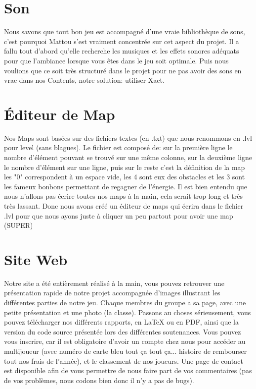 \documentclass [11pt]{report}
\begin{document}
	\section{Son}
	Nous savons que tout bon jeu est accompagné d'une vraie bibliothèque de sons, c'est pourquoi Mattou s'est vraiment concentrée sur cet aspect du projet. Il a fallu tout d'abord qu'elle recherche les musiques et les effets sonores adéquats pour que l'ambiance lorsque vous êtes dans le jeu soit optimale. Puis nous voulions que ce soit très structuré dans le projet pour ne pas avoir des sons en vrac dans nos Contents, notre solution: utiliser Xact. 
	
	\newpage
	\section{\'Editeur de Map}
	Nos Maps sont basées sur des fichiers textes (en .txt) que nous renommons en .lvl pour level (sans blagues). Le fichier est composé de: sur la première ligne le nombre d'élément pouvant se trouvé sur une même colonne, sur la deuxième ligne le nombre d'élément sur une ligne, puis sur le reste c'est la définition de la map %
	les "0" correspondent à un espace vide, les 4 sont eux des obstacles et les 3 sont les fameux bonbons permettant de regagner de l'énergie.
	\indent Il est bien entendu que nous n'allons pas écrire toutes nos maps à la main, cela serait trop long et très très lassant. Donc nous avons créé un éditeur de maps qui écrira dans le fichier .lvl pour que nous ayons juste à cliquer un peu partout pour avoir une map (SUPER) %
	 
	\section{Site Web}
	Notre site a été entièrement réalisé à la main, vous pouvez retrouver une présentation rapide de notre projet accompagnée d'images illustrant les différentes parties de notre jeu. Chaque membres du groupe a sa page, avec une petite présentation et une photo (la classe). Passons au choses sérieusement, vous pouvez télécharger nos différents rapports, en LaTeX ou en PDF, ainsi que la version du code source présentée lors des différentes soutenances. Vous pouvez vous inscrire, car il est obligatoire d'avoir un compte chez nous pour accéder au multijoueur (avec numéro de carte bleu tout ça tout ça... histoire de rembourser tout nos frais de l'année), et le classement de nos joueurs. Une page de contact est disponible afin de vous permettre de nous faire part de vos commentaires (pas de vos problèmes, nous codons bien donc il n'y a pas de bugs).
\end{document}

